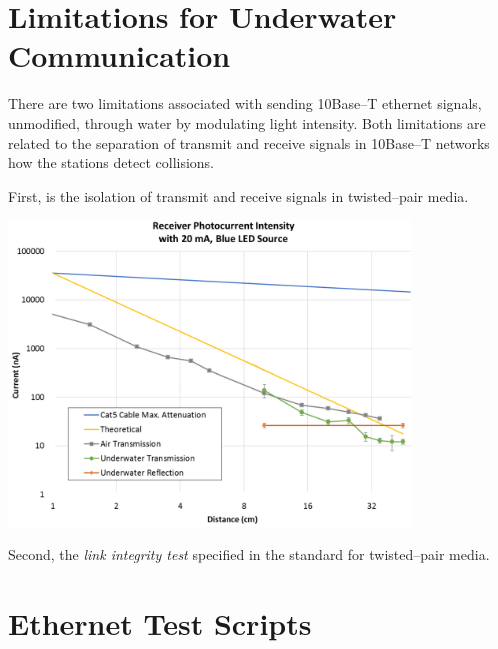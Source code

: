 \documentclass{article}
\begin{document}
\section{Limitations for Underwater Communication}

There are two limitations associated with sending 10Base--T ethernet signals,
unmodified, through water by modulating light intensity.
Both limitations are related to the separation of transmit and receive signals
in 10Base--T networks how the stations detect collisions.

First, is the isolation of transmit and receive signals in twisted--pair media.

\begin{center}
	\includegraphics[width=0.8\textwidth]{crossover-point.pdf}
	\label{crossover-point}
\end{center}

Second, the \textit{link integrity test} specified in the standard for twisted--pair media.

\appendix

\pagebreak
\section{Ethernet Test Scripts}



\pagebreak


\pagebreak

\end{document}
